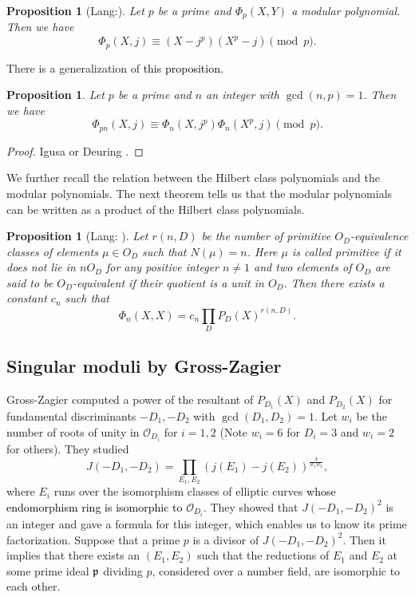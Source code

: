 \documentclass[a4paper, 11pt]{article}
\theoremstyle{plain}
\newtheorem{prop}[defn]{Proposition}
\newcommand{\?}{\textcolor{red}{??}}
\newcommand{\cO}{\mathcal{O}}
\begin{document}
\begin{prop}[Lang:{\cite[5,\S2]{SL}}]
\label{prop:kronecker1}
    Let $p$ be a prime and $\Phi_p(X,Y)$  a modular polynomial. Then we have
    \[
    \Phi_p(X,j) \equiv(X-j^p)(X^p-j) \pmod p.
    \]
\end{prop}
There is a generalization of \textcolor{black}{this proposition.}
\begin{prop}
\label{generalkronecker}
    Let $p$ be a prime and $n$ an integer with $\gcd(n,p)=1$. Then we have
\[
\Phi_{pn}(X,j) \equiv \Phi_n(X,j^p)\Phi_n(X^p,j) \pmod p.
\]
\end{prop}
\begin{proof}
    Igusa \cite[p.569]{Igusa_ell} or Deuring \cite{Deu}. 
\end{proof}
We further recall the relation between the Hilbert class polynomials and the modular polynomials.  The next theorem tells us that the modular polynomials can be written as a product of the Hilbert class polynomials.
\begin{prop}[Lang:{\cite[10, Appendix]{SL}} ]
\label{mojularandhirbert}
Let $r(n,D)$ be the number of primitive $O_D$-equivalence classes of elements $\mu\in O_D$ such that $N(\mu)=n$. Here $\mu$ is called primitive if it does not lie in $nO_D$ for any positive integer $n\ne1$ and two elements of $O_D$ are said to be $O_D$-equivalent if their quotient is a unit in $O_D$. Then there exists a constant $c_n$ such that
\[
\Phi_n(X,X)=c_n \prod_{ D }P_D(X)^{r(n,D)}.\]

\end{prop}

\subsection{Singular moduli by Gross-Zagier}\label{subsec:GZ}

Gross-Zagier \cite{GZ} computed a power of
the resultant of $P_{D_1}(X)$ and $P_{D_2}(X)$ for fundamental discriminants $-D_1,-D_2$ with $\gcd(D_1,D_2)=1$.
Let $w_i$ be the number of roots of unity
in $\cO_{D_i}$ for $i=1,2$ (Note $w_i=6$ for $D_i=3$ and $w_i=2$ for others).
They studied
\begin{equation}
J(-D_1,-D_2) = \prod_{E_1,E_2}(j(E_1)-j(E_2))^{\frac{4}{w_1w_2}},
\end{equation}
where $E_i$ runs over the isomorphism classes of elliptic curves \textcolor{black}{whose endomorphism ring is isomorphic to $\cO_{D_i}$.}  They showed that $J(-D_1,-D_2)^2$ is an integer and gave a formula for this integer,
which enables us to know its prime factorization.
Suppose that a prime $p$ is a divisor of $J(-D_1,-D_2)^2$.
Then it implies that there exists an $(E_1,E_2)$ such that the reductions  of $E_1$ and $E_2$ at some prime ideal $\frak p$ dividing $p$, considered over a number field,
are isomorphic to each other.
\end{document}
